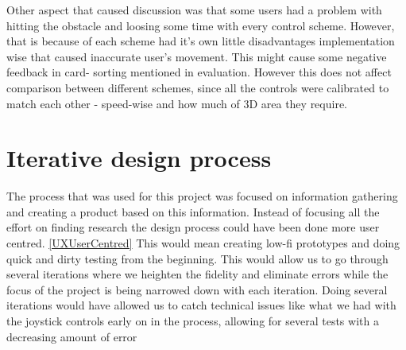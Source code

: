 Other aspect that caused discussion was that some users had a problem with hitting the obstacle and loosing some time with every control scheme. However, that is because of each scheme had it’s own little disadvantages implementation wise that caused inaccurate user’s movement. 
This might cause some negative feedback in card- sorting mentioned in evaluation. However this does not affect comparison between different schemes, since all the controls were calibrated to match each other - speed-wise and how much of 3D area they require. 

\section*{Iterative design process}
The process that was used for this project was focused on information gathering and creating a product based on this information.
Instead of focusing all the effort on finding research the design process could have been done more user centred. \ref{UXUserCentred}
This would mean creating low-fi prototypes and doing quick and dirty testing from the beginning. This would allow us to go through several iterations where we heighten the fidelity and eliminate errors while the focus of the project is being narrowed down with each iteration. Doing several iterations would have allowed us to catch technical issues like what we had with the joystick controls early on in the process, allowing for several tests with a decreasing amount of error
